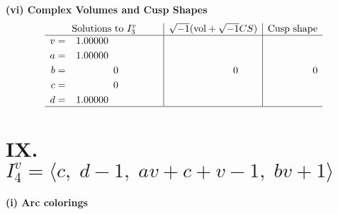 \documentclass[1p]{elsarticle_modified}
\theoremstyle{definition}
\newcommand{\I}{\sqrt{-1}}
\begin{document}
\newpage\flushleft \textbf{(vi) Complex Volumes and Cusp Shapes}
$$\begin{array}{c|c|c}  
\text{Solutions to }I^v_{3}& \I (\text{vol} + \sqrt{-1}CS) & \text{Cusp shape}\\
 \hline 
\begin{aligned}
v &= \phantom{-}1.00000\phantom{ +0.000000I} \\
a &= \phantom{-}1.00000\phantom{ +0.000000I} \\
b &= \phantom{-0.000000 } 0 \\
c &= \phantom{-0.000000 } 0 \\
d &= \phantom{-}1.00000\phantom{ +0.000000I}\end{aligned}
 & \phantom{-0.000000 } 0 & \phantom{-0.000000 } 0\\
 \hline 
 \end{array}$$\newpage\newpage\renewcommand{\arraystretch}{1}
\centering \section*{IX. $I^v_{4}= \langle c,\;d-1,\;a v+c+v-1,\;b v+1 \rangle$}
\flushleft \textbf{(i) Arc colorings}\\
\end{document}

